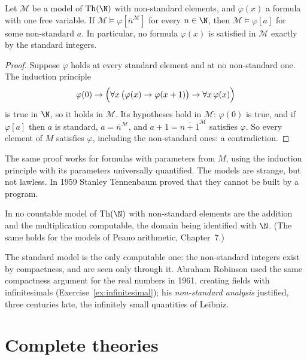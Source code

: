 \begin{proposition}[overspill]\label{prop:overspill}
Let $\mathcal M$ be a model of $\mathrm{Th}(\N)$ with non-standard elements, and $\varphi(x)$ a formula with one free variable. If $\mathcal M\models\varphi[\overline n^{\mathcal M}]$ for every $n\in\N$, then $\mathcal M\models\varphi[a]$ for some non-standard $a$. In particular, no formula $\varphi(x)$ is satisfied in $\mathcal M$ exactly by the standard integers.
\end{proposition}

\begin{proof}
Suppose $\varphi$ holds at every standard element and at no non-standard one. The induction principle
\[
\varphi(0)\to\Bigl(\forall x\,\bigl(\varphi(x)\to\varphi(x+1)\bigr)\to\forall x\,\varphi(x)\Bigr)
\]
is true in $\N$, so it holds in $\mathcal M$. Its hypotheses hold in $\mathcal M$: $\varphi(0)$ is true, and if $\varphi[a]$ then $a$ is standard, $a=\overline n^{\mathcal M}$, and $a+1=\overline{n+1}^{\mathcal M}$ satisfies $\varphi$. So every element of $M$ satisfies $\varphi$, including the non-standard ones: a contradiction.
\end{proof}

The same proof works for formulas with parameters from $M$, using the induction principle with its parameters universally quantified. The models are strange, but not lawless. In 1959 Stanley Tennenbaum proved that they cannot be built by a program.

\begin{theorem}\label{thm:tennenbaum}
In no countable model of $\mathrm{Th}(\N)$ with non-standard elements are the addition and the multiplication computable, the domain being identified with $\N$. (The same holds for the models of Peano arithmetic, Chapter~7.)
\end{theorem}

The standard model is the only computable one: the non-standard integers exist by compactness, and are seen only through it. Abraham Robinson used the same compactness argument for the real numbers in 1961, creating fields with infinitesimals (Exercise~\ref{ex:infinitesimal}); his \emph{non-standard analysis} justified, three centuries late, the infinitely small quantities of Leibniz.

\section{Complete theories}\label{sec:completetheories}

